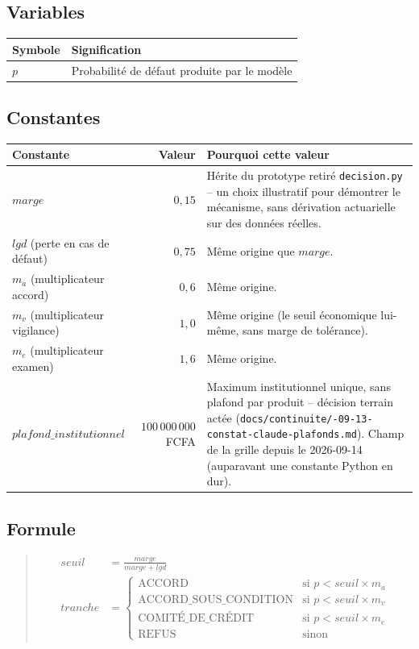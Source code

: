 \documentclass[11pt,a4paper]{article}
\newcommand{\brk}{\allowbreak}
\newenvironment{formule}{\begin{quote}}{\end{quote}}
\begin{document}
\subsection*{Variables}

\begin{tabular}{@{}lL{9.5cm}@{}}
\toprule
Symbole & Signification \\
\midrule
$p$ & Probabilité de défaut produite par le modèle \\
\bottomrule
\end{tabular}

\subsection*{Constantes}

\begin{tabular}{@{}L{3.2cm}rL{6.9cm}@{}}
\toprule
Constante & Valeur & Pourquoi cette valeur \\
\midrule
$\mathit{marge}$ & $0{,}15$ & Hérite du prototype retiré \texttt{decision.py} -- un choix
  illustratif pour démontrer le mécanisme, sans dérivation actuarielle sur des données
  réelles. \\
$\mathit{lgd}$ (perte en cas de défaut) & $0{,}75$ & Même origine que $\mathit{marge}$. \\
$m_a$ (multiplicateur accord) & $0{,}6$ & Même origine. \\
$m_v$ (multiplicateur vigilance) & $1{,}0$ & Même origine (le seuil économique lui-même, sans
  marge de tolérance). \\
$m_e$ (multiplicateur examen) & $1{,}6$ & Même origine. \\
$\mathit{plafond\_institutionnel}$ & $100\,000\,000$ FCFA & Maximum institutionnel unique,
  sans plafond par produit -- décision terrain actée
  (\texttt{docs/\brk continuite/\brk 2026-09-13-constat-claude-plafonds.md}). Champ de la
  grille depuis le 2026-09-14 (auparavant une constante Python en dur). \\
\bottomrule
\end{tabular}

\subsection*{Formule}
\begin{formule}
\begin{align}
\mathit{seuil} &= \frac{\mathit{marge}}{\mathit{marge} + \mathit{lgd}} \\[0.3em]
\mathit{tranche} &=
\begin{cases}
\text{ACCORD} & \text{si } p < \mathit{seuil} \times m_a \\
\text{ACCORD\_SOUS\_CONDITION} & \text{si } p < \mathit{seuil} \times m_v \\
\text{COMITÉ\_DE\_CRÉDIT} & \text{si } p < \mathit{seuil} \times m_e \\
\text{REFUS} & \text{sinon}
\end{cases}
\end{align}
\end{formule}
\end{document}
